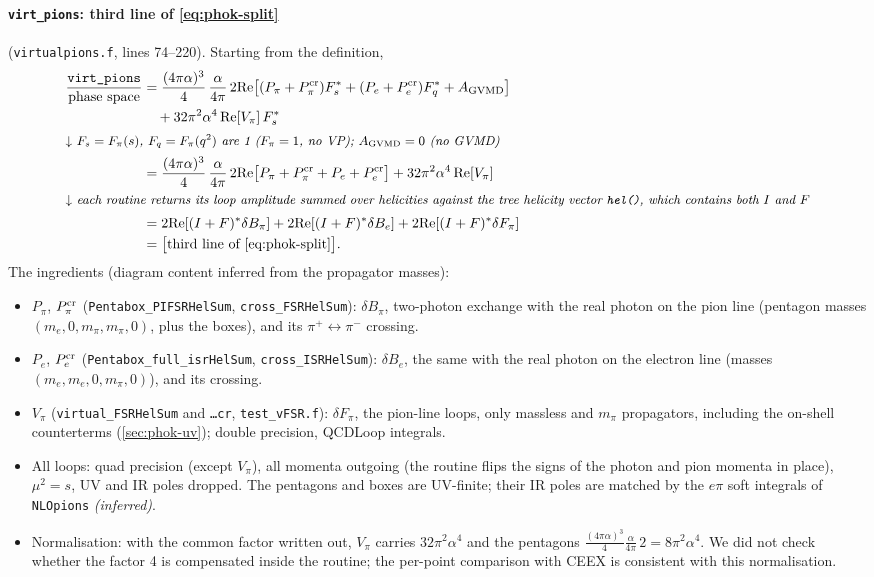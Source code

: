 \documentclass[11pt,a4paper]{article}
\newcommand{\code}[1]{\texttt{#1}}
\newcommand{\ceex}{CEEX}
\begin{document}
\paragraph{\code{virt\_pions}: third line of \cref{eq:phok-split}} (\code{virtualpions.f},
lines 74--220). Starting from the definition,
\begin{align*}
\frac{\code{virt\_pions}}{\text{phase space}}
&= \frac{(4\pi\alpha)^3}{4}\,\frac{\alpha}{4\pi}\,
   2{\rm Re}\big[(P_\pi+P_\pi^{\rm cr})F_s^*+(P_e+P_e^{\rm cr})F_q^*+A_{\rm GVMD}\big]\\
&\quad+32\pi^2\alpha^4\,{\rm Re}[V_\pi]\,F_s^*\\
\intertext{\small\emph{$\downarrow$ $F_s=F_\pi(s)$, $F_q=F_\pi(q^2)$ are 1 ($F_\pi=1$, no VP);
  $A_{\rm GVMD}=0$ (no GVMD)}}
&= \frac{(4\pi\alpha)^3}{4}\,\frac{\alpha}{4\pi}\,
   2{\rm Re}\big[P_\pi+P_\pi^{\rm cr}+P_e+P_e^{\rm cr}\big]+32\pi^2\alpha^4\,{\rm Re}[V_\pi]\\
\intertext{\small\emph{$\downarrow$ each routine returns its loop amplitude summed over helicities
  against the tree helicity vector \code{hel()}, which contains both $I$ and $F$}}
&= 2{\rm Re}[(I+F)^*\delta B_\pi]+2{\rm Re}[(I+F)^*\delta B_e]+2{\rm Re}[(I+F)^*\delta F_\pi]\\
&= \big[\text{third line of \cref{eq:phok-split}}\big].
\end{align*}
The ingredients (diagram content inferred from the propagator masses):
\begin{itemize}
\item $P_\pi$, $P_\pi^{\rm cr}$ (\code{Pentabox\_PIFSRHelSum}, \code{cross\_FSRHelSum}):
  $\delta B_\pi$, two-photon exchange with the real photon on the pion line (pentagon masses
  $(m_e,0,m_\pi,m_\pi,0)$, plus the boxes), and its $\pi^+\leftrightarrow\pi^-$ crossing.
\item $P_e$, $P_e^{\rm cr}$ (\code{Pentabox\_full\_isrHelSum}, \code{cross\_ISRHelSum}):
  $\delta B_e$, the same with the real photon on the electron line (masses
  $(m_e,m_e,0,m_\pi,0)$), and its crossing.
\item $V_\pi$ (\code{virtual\_FSRHelSum} and \code{\ldots cr}, \code{test\_vFSR.f}): $\delta F_\pi$,
  the pion-line loops, only massless and $m_\pi$ propagators, including the on-shell
  counterterms (\cref{sec:phok-uv}); double precision, QCDLoop integrals.
\item All loops: quad precision (except $V_\pi$), all momenta outgoing (the routine flips the
  signs of the photon and pion momenta in place), $\mu^2=s$, UV and IR poles dropped. The
  pentagons and boxes are UV-finite; their IR poles are matched by the $e\pi$ soft integrals of
  \code{NLOpions} \emph{(inferred)}.
\item Normalisation: with the common factor written out, $V_\pi$ carries $32\pi^2\alpha^4$ and the
  pentagons $\frac{(4\pi\alpha)^3}{4}\frac{\alpha}{4\pi}\,2=8\pi^2\alpha^4$. We did not check
  whether the factor 4 is compensated inside the routine; the per-point comparison with \ceex{}
  is consistent with this normalisation.
\end{itemize}
\end{document}
